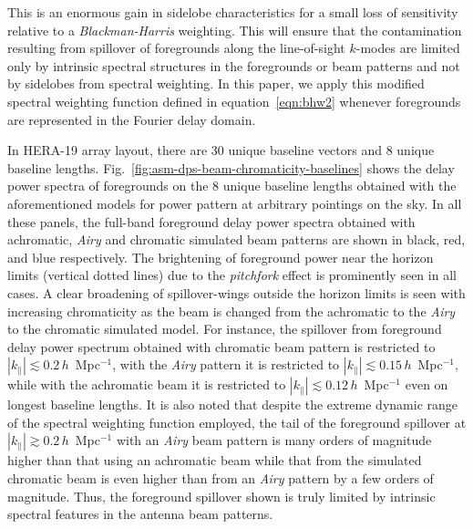 \documentclass[preprint2,iop,numberedappendix,twocolappendix,appendixfloats]{emulateapj}
\begin{document}
\begin{figure}[htb]
  \label{fig:window-functions}
\end{figure}

This is an enormous gain in sidelobe characteristics for a small loss of sensitivity relative to a {\it Blackman-Harris} weighting. This will ensure that the contamination resulting from spillover of foregrounds along the line-of-sight $k$-modes are limited only by intrinsic spectral structures in the foregrounds or beam patterns and not by sidelobes from spectral weighting. In this paper, we apply this modified spectral weighting function defined in equation~\ref{eqn:bhw2} whenever foregrounds are represented in the Fourier delay domain. 

In HERA-19 array layout, there are 30 unique baseline vectors and 8 unique baseline lengths. Fig.~\ref{fig:asm-dps-beam-chromaticity-baselines} shows the delay power spectra of foregrounds on the 8 unique baseline lengths obtained with the aforementioned models for power pattern at arbitrary pointings on the sky. In all these panels, the full-band foreground delay power spectra obtained with achromatic, {\it Airy} and chromatic simulated beam patterns are shown in black, red, and blue respectively. The brightening of foreground power near the horizon limits (vertical dotted lines) due to the {\it pitchfork} effect \citep{thy15a,thy15b} is prominently seen in all cases. A clear broadening of spillover-wings outside the horizon limits is seen with increasing chromaticity as the beam is changed from the achromatic to the {\it Airy} to the chromatic simulated model. For instance, the spillover from foreground delay power spectrum obtained with chromatic beam pattern is restricted to $|k_\parallel| \lesssim 0.2\,h$~Mpc$^{-1}$, with the {\it Airy} pattern it is restricted to $|k_\parallel| \lesssim 0.15\,h$~Mpc$^{-1}$, while with the achromatic beam it is restricted to $|k_\parallel| \lesssim 0.12\,h$~Mpc$^{-1}$ even on longest baseline lengths. It is also noted that despite the extreme dynamic range of the spectral weighting function employed, the tail of the foreground spillover at $|k_\parallel| \gtrsim 0.2\,h$~Mpc$^{-1}$ with an {\it Airy} beam pattern is many orders of magnitude higher than that using an achromatic beam while that from the simulated chromatic beam is even higher than from an {\it Airy} pattern by a few orders of magnitude. Thus, the foreground spillover shown is truly limited by intrinsic spectral features in the antenna beam patterns. 
\end{document}
